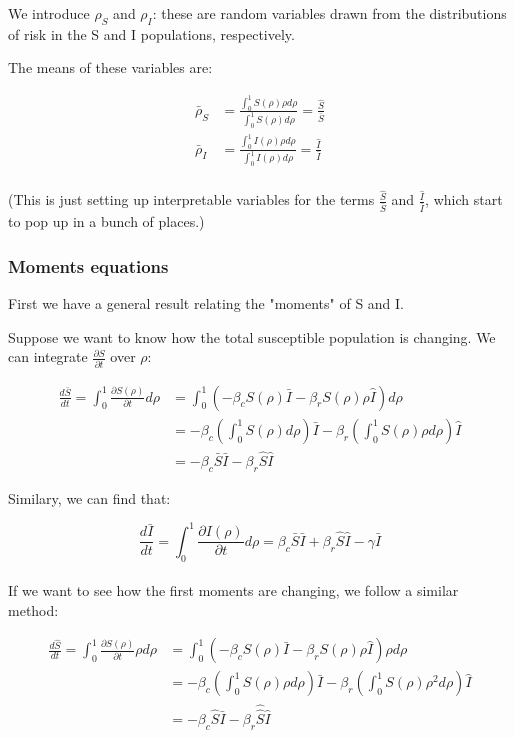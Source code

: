 \documentclass{article}
\begin{document}
{We introduce $\rho_S$ and $\rho_I$: these are random variables drawn from
the distributions of risk in the S and I populations, respectively.

The means of these variables are:

\begin{align*}
\bar\rho_S
&= \frac{\int_{0}^{1} S(\rho) \rho d\rho}{\int_{0}^{1} S(\rho) d\rho}
= \frac{\hat S}{\bar S}\\
\bar\rho_I
&= \frac{\int_{0}^{1} I(\rho) \rho d\rho}{\int_{0}^{1} I(\rho) d\rho}
= \frac{\hat I}{\bar I}\\
\end{align*}

(This is just setting up interpretable variables for the terms
$\frac{\hat S}{\bar S}$ and $\frac{\hat I}{\bar I}$, which start to pop up
in a bunch of places.)\\


\subsubsection{Moments equations}

First we have a general result relating the "moments" of S and I.


Suppose we want to know how the total susceptible population is changing. We
can integrate $\frac{\partial S}{\partial t}$ over $\rho$:

\begin{align*}
\frac{d \bar{S}}{dt} = \int_{0}^{1} \frac{\partial S(\rho)}{\partial t} d\rho
&= \int_{0}^{1} (-\beta_c S(\rho) \bar I - \beta_r S(\rho) \rho \hat I) d\rho  \\
&= -\beta_c (\int_{0}^{1} S(\rho) d\rho) \bar I
	- \beta_r (\int_{0}^{1} S(\rho) \rho d\rho) \hat I\\
&= -\beta_c \bar S \bar I - \beta_r \hat S \hat I
\end{align*}

Similary, we can find that:

$$\frac{d \bar{I}}{dt} = \int_{0}^{1} \frac{\partial I(\rho)}{\partial t} d\rho
= \beta_c \bar S \bar I + \beta_r \hat S \hat I - \gamma \bar I$$\\

If we want to see how the first moments are changing, we follow a similar method:

\begin{align*}
\frac{d \hat{S}}{dt} = \int_{0}^{1} \frac{\partial S(\rho)}{\partial t} \rho d\rho
&= \int_{0}^{1} (-\beta_c S(\rho) \bar I - \beta_r S(\rho) \rho \hat I) \rho d\rho  \\
&= -\beta_c (\int_{0}^{1} S(\rho) \rho d\rho) \bar I
	- \beta_r (\int_{0}^{1} S(\rho) \rho^2 d\rho) \hat I\\
&= -\beta_c \hat S \bar I - \beta_r \hat{\hat{ S}} \hat I
\end{align*}\\

}
\end{document}
